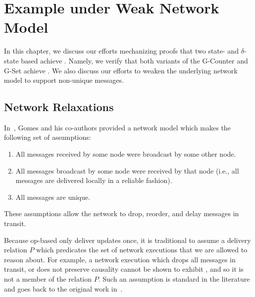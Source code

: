 \chapter{Example \CRDTs under Weak Network Model}
\label{chap:example-crdts}

%
% 
%
% 
%
% 
%
% 
%

In this chapter, we discuss our efforts mechanizing proofs that two state- and
$\delta$-state based \CRDTs achieve \SEC. Namely, we verify that both variants
of the G-Counter and G-Set achieve \SEC. We also discuss our efforts to weaken
the underlying network model to support non-unique messages. \TODO

\section{Network Relaxations}
\label{sec:network-relaxations}
In~\citep{gomes17}, Gomes and his co-authors provided a network model which
makes the following set of assumptions:
\begin{enumerate}
  \item All messages received by some node were broadcast by some other node.
  \item All messages broadcast by some node were received by that node (i.e.,
    all messages are delivered locally in a reliable fashion).
  \item All messages are unique.
\end{enumerate}
These assumptions allow the network to drop, reorder, and delay messages in
transit.

Because op-based \CRDTs only deliver updates once, it is traditional to assume a
delivery relation $P$ which predicates the set of network executions that we are
allowed to reason about. For example, a network execution which drops all
messages in transit, or does not preserve causality cannot be shown to exhibit
\SEC, and so it is not a member of the relation $P$.  Such an assumption is
standard in the literature and goes back to the original work
in~\citep{shapiro11}.

